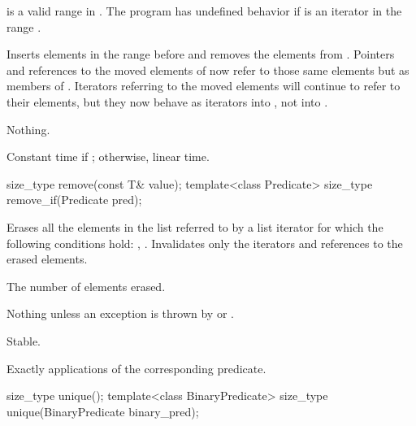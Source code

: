 \begin{itemdescr}
\pnum
\requires
\tcode{[first, last)}
is a valid range in
.
The program has undefined behavior if
is an iterator in the range
.

\pnum
\effects
Inserts elements in the range
before
and removes the elements from
.
Pointers and references to the moved elements of
now refer to those same elements but as members of
.
Iterators referring to the moved elements will continue to refer to their
elements, but they now behave as iterators into
,
not into
.

\pnum
\throws Nothing.

\pnum
\complexity
Constant time if
;
otherwise, linear time.
\end{itemdescr}

%
\begin{itemdecl}
size_type remove(const T& value);
template<class Predicate> size_type remove_if(Predicate pred);
\end{itemdecl}

\begin{itemdescr}
\pnum
\effects
Erases all the elements in the list referred to by a list iterator  for which the
following conditions hold: , .
Invalidates only the iterators and references to the erased elements.

\pnum
\returns The number of elements erased.

\pnum
\throws
Nothing unless an exception is thrown by
or
.

\pnum
\remarks Stable.

\pnum
\complexity
Exactly
applications of the corresponding predicate.
\end{itemdescr}

%
\begin{itemdecl}
size_type unique();
template<class BinaryPredicate> size_type unique(BinaryPredicate binary_pred);
\end{itemdecl}

